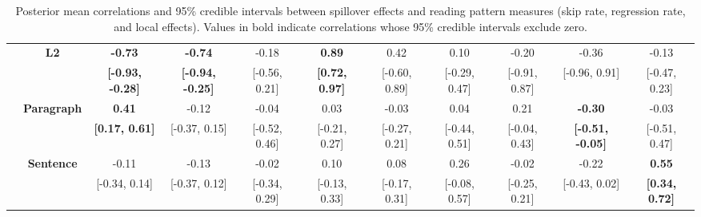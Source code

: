 \begin{table}[ht]
{{\begin{tabular}{@{}>{\centering\arraybackslash}m{0.9cm}@{}c ccccccccc@{}}
\\
\addlinespace[6pt]
 & \multirow{2}{*}{\textbf{L2}} & \rule{0pt}{2.2ex} \textbf{-0.73} & \textbf{-0.74} & -0.18 & \textbf{0.89} & 0.42 & 0.10 & -0.20 & -0.36 & -0.13
\\
 &  & \rule{0pt}{2.2ex} \textbf{[-0.93, -0.28]} & \textbf{[-0.94, -0.25]} & [-0.56, 0.21] & \textbf{[0.72, 0.97]} & [-0.60, 0.89] & [-0.29, 0.47] & [-0.91, 0.87] & [-0.96, 0.91] & [-0.47, 0.23]
\\
 \midrule
\multirow{4}{*}{\centering\rotatebox[origin=c]{90}{\textbf{HKC}}} & \multirow{2}{*}{\textbf{Paragraph}} & \rule{0pt}{2.2ex} \textbf{0.41} & -0.12 & -0.04 & 0.03 & -0.03 & 0.04 & 0.21 & \textbf{-0.30} & -0.03
\\
 &  & \rule{0pt}{2.2ex} \textbf{[0.17, 0.61]} & [-0.37, 0.15] & [-0.52, 0.46] & [-0.21, 0.27] & [-0.27, 0.21] & [-0.44, 0.51] & [-0.04, 0.43] & \textbf{[-0.51, -0.05]} & [-0.51, 0.47]
\\
\addlinespace[6pt]
 & \multirow{2}{*}{\textbf{Sentence}} & \rule{0pt}{2.2ex} -0.11 & -0.13 & -0.02 & 0.10 & 0.08 & 0.26 & -0.02 & -0.22 & \textbf{0.55}
\\
 &  & \rule{0pt}{2.2ex} [-0.34, 0.14] & [-0.37, 0.12] & [-0.34, 0.29] & [-0.13, 0.33] & [-0.17, 0.31] & [-0.08, 0.57] & [-0.25, 0.21] & [-0.43, 0.02] & \textbf{[0.34, 0.72]}
\\
 \midrule
\bottomrule
\end{tabular}
}%
}%
\caption{Posterior mean correlations and 95\% credible intervals between spillover effects and reading pattern measures (skip rate, regression rate, and local effects). Values in bold indicate correlations whose 95\% credible intervals exclude zero.}
\label{tab:cor_behav_meas}
\end{table}
